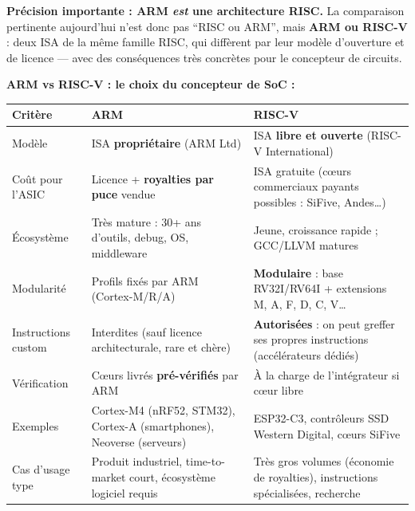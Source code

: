 \documentclass[12pt,a4paper,twoside]{book}
\begin{document}
\begin{attention}
\textbf{Précision importante : ARM \textit{est} une architecture RISC.} La comparaison pertinente aujourd'hui n'est donc pas ``RISC ou ARM'', mais \textbf{ARM ou RISC-V} : deux ISA de la même famille RISC, qui diffèrent par leur modèle d'ouverture et de licence --- avec des conséquences très concrètes pour le concepteur de circuits.
\end{attention}

\begin{formule}
\textbf{ARM vs RISC-V : le choix du concepteur de SoC :}

\begin{center}
\renewcommand{\arraystretch}{1.45}
\begin{tabular}{p{3.0cm}p{4.8cm}p{4.8cm}}
\toprule
\textbf{Critère} & \textbf{ARM} & \textbf{RISC-V} \\
\midrule
Modèle & ISA \textbf{propriétaire} (ARM Ltd) & ISA \textbf{libre et ouverte} (RISC-V International) \\
Coût pour l'ASIC & Licence + \textbf{royalties par puce} vendue & ISA gratuite (cœurs commerciaux payants possibles : SiFive, Andes\ldots) \\
Écosystème & Très mature : 30+ ans d'outils, debug, OS, middleware & Jeune, croissance rapide ; GCC/LLVM matures \\
Modularité & Profils fixés par ARM (Cortex-M/R/A) & \textbf{Modulaire} : base RV32I/RV64I + extensions M, A, F, D, C, V\ldots \\
Instructions custom & Interdites (sauf licence architecturale, rare et chère) & \textbf{Autorisées} : on peut greffer ses propres instructions (accélérateurs dédiés) \\
Vérification & Cœurs livrés \textbf{pré-vérifiés} par ARM & À la charge de l'intégrateur si cœur libre \\
Exemples & Cortex-M4 (nRF52, STM32), Cortex-A (smartphones), Neoverse (serveurs) & ESP32-C3, contrôleurs SSD Western Digital, cœurs SiFive \\
Cas d'usage type & Produit industriel, time-to-market court, écosystème logiciel requis & Très gros volumes (économie de royalties), instructions spécialisées, recherche \\
\bottomrule
\end{tabular}
\end{center}
\end{formule}
\end{document}
